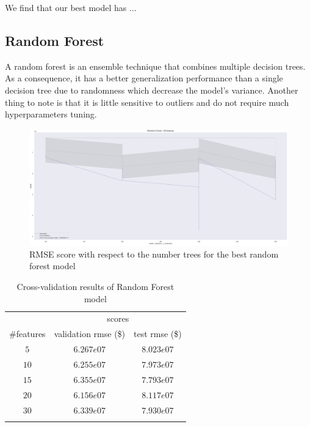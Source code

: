 We find that our best model has ...

\subsection{Random Forest}

A random forest is an ensemble technique that combines multiple decision trees. As a consequence, it has a better generalization performance than a single decision tree due to randomness which decrease the model's variance. Another thing to note is that it is little sensitive to outliers and do not require much hyperparameters tuning.

\begin{figure}[H]
	\centering
	\includegraphics{figures/rf_eval.pdf}
	\caption{RMSE score with respect to the number trees for the best random forest model}
	\label{fig:rf_eval}
\end{figure}

\begin{table}[H]
	\centering
	\begin{tabular}{ccc} \toprule
	  & \multicolumn {2}{c}{scores} \\\cmidrule(lr) {2-3}
	  \#features         & validation rmse (\$)             & test rmse (\$) \\\hline
	  $5$        		& $6.267e07	$                      	& $8.023e07$ \\
	  $10$        		& $6.255e07$                        & $7.973e07$ \\
	  $15$        		& $6.355e07$                        & $7.793e07$ \\
	  $20$             	& $6.156e07$                        & $8.117e07$ \\
	  $30$             	& $6.339e07$                        & $7.930e07$ \\
	  \\\hline
	\end{tabular}
	\caption{Cross-validation results of Random Forest model}
	\label{tab:rf-results}
\end{table}